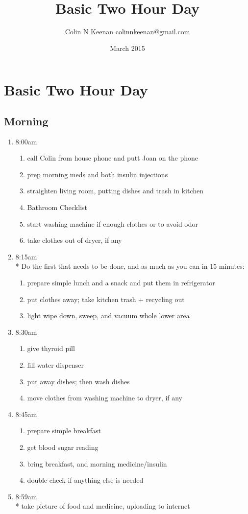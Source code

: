 \documentclass[12pt,letterpaper]{article}
\newcommand{\mytitle}{Basic Two Hour Day}
\begin{document}
\title{\mytitle{}}
\author{Colin N Keenan colinnkeenan@gmail.com}
\date{March 2015}
\section*{\mytitle{}}
\begin{multicols}{2} 
\subsection*{Morning}
\begin{enumerate}
	\item 8:00am
		\begin{enumerate}
			\item call Colin from house phone and putt Joan on the phone
			\item prep morning meds and both insulin injections
			\item straighten living room, putting dishes and trash in kitchen
			\item Bathroom Checklist
			\item start washing machine if enough clothes or to avoid odor
			\item take clothes out of dryer, if any
		\end{enumerate}
	\item 8:15am \\*
		Do the first that needs to be done, and as much as you can in 15 minutes:
		\begin{enumerate}
			\item prepare simple lunch and a snack and put them in refrigerator
			\item put clothes away; take kitchen trash + recycling out
			\item light wipe down, sweep, and vacuum whole lower area
		\end{enumerate}
	\item 8:30am
		\begin{enumerate}
			\item give thyroid pill
			\item fill water dispenser
			\item put away dishes; then wash dishes
			\item move clothes from washing machine to dryer, if any
		\end{enumerate}
	\item 8:45am
		\begin{enumerate}
			\item prepare simple breakfast
			\item get blood sugar reading
			\item bring breakfast, and morning medicine/insulin
			\item double check if anything else is needed
		\end{enumerate}
	\item 8:59am \\*
		take picture of food and medicine, uploading to internet
\end{enumerate}


\end{multicols}
\end{document}
